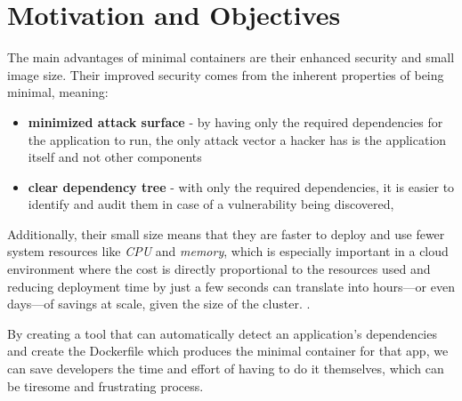 \chapter{Motivation and Objectives}
\label{chap:motivation-and-objectives}

The main advantages of minimal containers are their enhanced security and
small image size.
Their improved security comes from the inherent properties of being minimal, meaning:
\begin{itemize}
    \item \textbf{minimized attack surface} - by having only the required dependencies for the application to run,
the only attack vector a hacker has is the application itself and not other components
    \item \textbf{clear dependency tree} - with only the required dependencies, it is easier to identify and
audit them in case of a vulnerability being discovered,
\cite{minimal-containers}
\end{itemize}
Additionally, their small size means that they are faster to deploy and use fewer system resources like \textit{CPU} and \textit{memory},
which is especially important in a cloud environment where the cost is directly proportional to the resources used and reducing deployment time by just a few seconds
can translate into hours—or even days—of savings at scale, given the size of the cluster. \cite{container-deployment}.

By creating a tool that can automatically detect an application's dependencies and create the Dockerfile which produces the minimal container for that app,
we can save developers the time and effort of having to do it themselves, which can be tiresome and frustrating process.